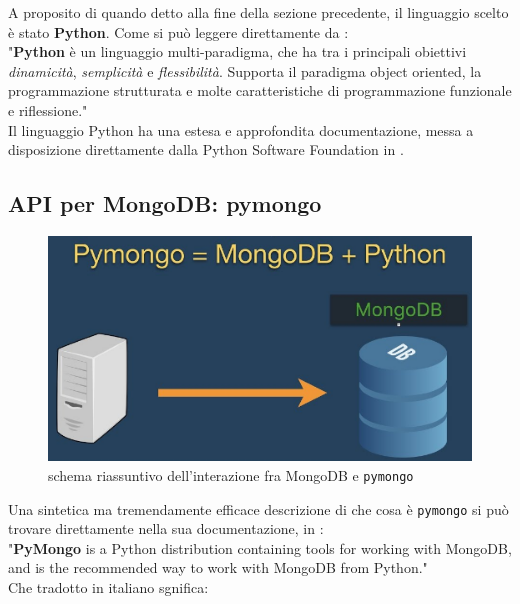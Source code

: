     A proposito di quando detto alla fine della sezione precedente, il linguaggio scelto è stato \textbf{Python}. Come si può leggere direttamente da \cite{pywiki}:\\

    "\textbf{Python} è un linguaggio multi-paradigma, che ha tra i principali obiettivi \textit{dinamicità}, \textit{semplicità} e \textit{flessibilità}. Supporta il paradigma object oriented, la programmazione strutturata e molte caratteristiche di programmazione funzionale e riflessione." \\

    Il linguaggio Python ha una estesa e approfondita documentazione, messa a disposizione direttamente dalla Python Software Foundation in \cite{python}.

    \subsection{API per MongoDB: pymongo}

        \begin{figure}
            \centering
            \caption{schema riassuntivo dell'interazione fra MongoDB e \texttt{pymongo}}
            \label{pymongo_logo}
    	    \includegraphics[scale=0.70]{img/pymongo.png}
        \end{figure}

        Una sintetica ma tremendamente efficace descrizione di che cosa è \texttt{pymongo} si può trovare direttamente nella sua documentazione, in \cite{pymongo}:\\

        "\textbf{PyMongo} is a Python distribution containing tools for working with MongoDB, and is the recommended way to work with MongoDB from Python." \\

        Che tradotto in italiano sgnifica: \\

